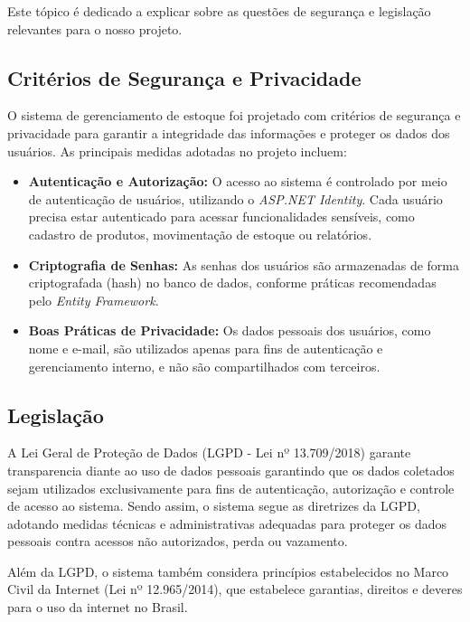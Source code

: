 \documentclass[
	12pt,				%
	openany,			%
	twoside,			%
	a4paper,			%
	english,			%
	brazil				%
	]{abntex2}
\begin{document}
Este tópico é dedicado a explicar sobre as questões de segurança e legislação relevantes para o nosso projeto.


\subsection{Critérios de Segurança e Privacidade}

O sistema de gerenciamento de estoque foi projetado com critérios de segurança e privacidade para garantir a integridade das informações e proteger os dados dos usuários. As principais medidas adotadas no projeto incluem:

\begin{itemize}
    \item \textbf{Autenticação e Autorização:} O acesso ao sistema é controlado por meio de autenticação de usuários, utilizando o \textit{ASP.NET Identity}. Cada usuário precisa estar autenticado para acessar funcionalidades sensíveis, como cadastro de produtos, movimentação de estoque ou relatórios.

    \item \textbf{Criptografia de Senhas:} As senhas dos usuários são armazenadas de forma criptografada (hash) no banco de dados, conforme práticas recomendadas pelo \textit{Entity Framework}.

    \item \textbf{Boas Práticas de Privacidade:} Os dados pessoais dos usuários, como nome e e-mail, são utilizados apenas para fins de autenticação e gerenciamento interno, e não são compartilhados com terceiros.
\end{itemize}

\subsection{Legislação}

A  Lei Geral de Proteção de Dados (LGPD - Lei nº 13.709/2018) garante transparencia diante ao uso de dados pessoais garantindo que os dados coletados sejam utilizados exclusivamente para fins de autenticação, autorização e controle de acesso ao sistema. Sendo assim, o sistema segue as diretrizes da LGPD, adotando medidas técnicas e administrativas adequadas para proteger os dados pessoais contra acessos não autorizados, perda ou vazamento. 

Além da LGPD, o sistema também considera princípios estabelecidos no Marco Civil da Internet (Lei nº 12.965/2014), que estabelece garantias, direitos e deveres para o uso da internet no Brasil.
\end{document}
